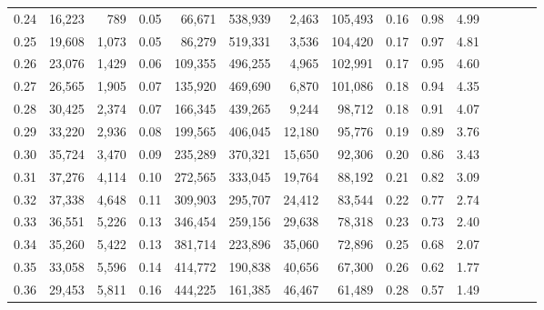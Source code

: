\begin{tabular}{rrrcrrrrrrrrrrr}
0.24 &  16,223 &    789 &                                       0.05 &   66,671 &  538,939 &    2,463 &  105,493 &  0.16 &  0.98 &                         4.99 \\
0.25 &  19,608 &  1,073 &                                       0.05 &   86,279 &  519,331 &    3,536 &  104,420 &  0.17 &  0.97 &                         4.81 \\
0.26 &  23,076 &  1,429 &                                       0.06 &  109,355 &  496,255 &    4,965 &  102,991 &  0.17 &  0.95 &                         4.60 \\
0.27 &  26,565 &  1,905 &                                       0.07 &  135,920 &  469,690 &    6,870 &  101,086 &  0.18 &  0.94 &                         4.35 \\
0.28 &  30,425 &  2,374 &                                       0.07 &  166,345 &  439,265 &    9,244 &   98,712 &  0.18 &  0.91 &                         4.07 \\
0.29 &  33,220 &  2,936 &                                       0.08 &  199,565 &  406,045 &   12,180 &   95,776 &  0.19 &  0.89 &                         3.76 \\
0.30 &  35,724 &  3,470 &                                       0.09 &  235,289 &  370,321 &   15,650 &   92,306 &  0.20 &  0.86 &                         3.43 \\
0.31 &  37,276 &  4,114 &                                       0.10 &  272,565 &  333,045 &   19,764 &   88,192 &  0.21 &  0.82 &                         3.09 \\
0.32 &  37,338 &  4,648 &                                       0.11 &  309,903 &  295,707 &   24,412 &   83,544 &  0.22 &  0.77 &                         2.74 \\
0.33 &  36,551 &  5,226 &                                       0.13 &  346,454 &  259,156 &   29,638 &   78,318 &  0.23 &  0.73 &                         2.40 \\
0.34 &  35,260 &  5,422 &                                       0.13 &  381,714 &  223,896 &   35,060 &   72,896 &  0.25 &  0.68 &                         2.07 \\
0.35 &  33,058 &  5,596 &                                       0.14 &  414,772 &  190,838 &   40,656 &   67,300 &  0.26 &  0.62 &                         1.77 \\
0.36 &  29,453 &  5,811 &                                       0.16 &  444,225 &  161,385 &   46,467 &   61,489 &  0.28 &  0.57 &                         1.49 \\

\end{tabular}
